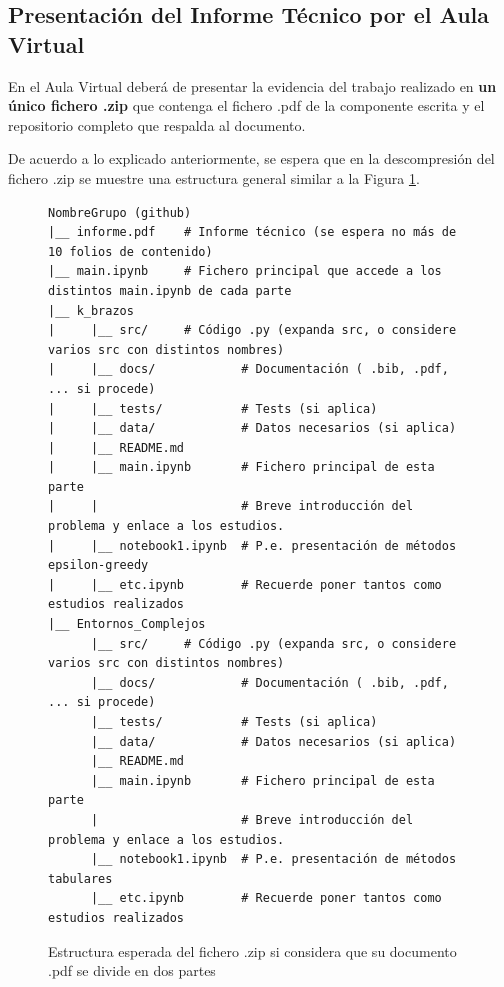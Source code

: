 \documentclass[a4paper, 11pt]{article}
\begin{document}
\subsection{Presentación del Informe Técnico por el Aula Virtual}

En el Aula Virtual deberá de presentar la evidencia del trabajo realizado en \textbf{un único fichero .zip} que contenga el fichero .pdf de la componente escrita y el repositorio completo que respalda al documento. 

De acuerdo a lo explicado anteriormente, se espera que en la descompresión del fichero .zip se muestre una  estructura general similar a la Figura \ref{fig:zip}.

\begin{figure}[htb]
\hfil\begin{minipage}{.7\textwidth}
\scriptsize
\begin{verbatim}
NombreGrupo (github)
|__ informe.pdf    # Informe técnico (se espera no más de 10 folios de contenido)
|__ main.ipynb     # Fichero principal que accede a los distintos main.ipynb de cada parte
|__ k_brazos
|     |__ src/     # Código .py (expanda src, o considere varios src con distintos nombres)
|     |__ docs/            # Documentación ( .bib, .pdf, ... si procede)
|     |__ tests/           # Tests (si aplica)
|     |__ data/            # Datos necesarios (si aplica)
|     |__ README.md 
|     |__ main.ipynb       # Fichero principal de esta parte
|     |                    # Breve introducción del problema y enlace a los estudios.
|     |__ notebook1.ipynb  # P.e. presentación de métodos epsilon-greedy
|     |__ etc.ipynb        # Recuerde poner tantos como estudios realizados
|__ Entornos_Complejos
      |__ src/     # Código .py (expanda src, o considere varios src con distintos nombres)
      |__ docs/            # Documentación ( .bib, .pdf, ... si procede)
      |__ tests/           # Tests (si aplica)
      |__ data/            # Datos necesarios (si aplica)
      |__ README.md 
      |__ main.ipynb       # Fichero principal de esta parte
      |                    # Breve introducción del problema y enlace a los estudios.
      |__ notebook1.ipynb  # P.e. presentación de métodos tabulares
      |__ etc.ipynb        # Recuerde poner tantos como estudios realizados
\end{verbatim}
\end{minipage}
\caption{Estructura esperada del fichero .zip
 si considera que su documento .pdf se divide en dos partes} \label{fig:zip}
\end{figure}
\end{document}
